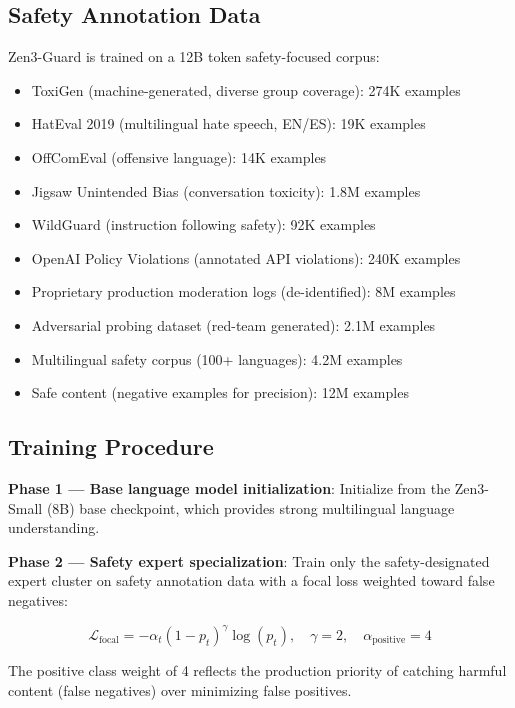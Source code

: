 \documentclass[11pt,a4paper]{article}
\begin{document}
\subsection{Safety Annotation Data}

Zen3-Guard is trained on a 12B token safety-focused corpus:

\begin{itemize}
\item ToxiGen (machine-generated, diverse group coverage): 274K examples
\item HatEval 2019 (multilingual hate speech, EN/ES): 19K examples
\item OffComEval (offensive language): 14K examples
\item Jigsaw Unintended Bias (conversation toxicity): 1.8M examples
\item WildGuard (instruction following safety): 92K examples
\item OpenAI Policy Violations (annotated API violations): 240K examples
\item Proprietary production moderation logs (de-identified): 8M examples
\item Adversarial probing dataset (red-team generated): 2.1M examples
\item Multilingual safety corpus (100+ languages): 4.2M examples
\item Safe content (negative examples for precision): 12M examples
\end{itemize}

\subsection{Training Procedure}

\textbf{Phase 1 --- Base language model initialization}: Initialize from the Zen3-Small
(8B) base checkpoint, which provides strong multilingual language understanding.

\textbf{Phase 2 --- Safety expert specialization}: Train only the safety-designated
expert cluster on safety annotation data with a focal loss weighted toward false negatives:

\begin{equation}
\mathcal{L}_{\text{focal}} = -\alpha_t (1 - p_t)^\gamma \log(p_t), \quad \gamma = 2, \quad \alpha_{\text{positive}} = 4
\end{equation}

The positive class weight of 4 reflects the production priority of catching harmful
content (false negatives) over minimizing false positives.
\end{document}
